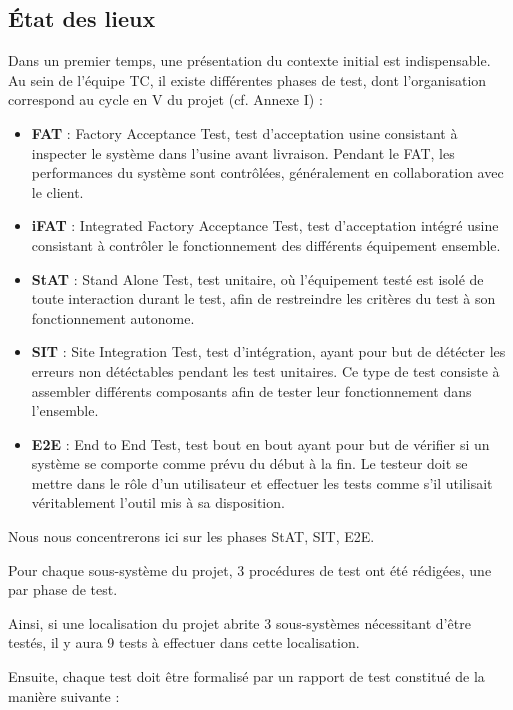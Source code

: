 \subsection{État des lieux}
Dans un premier temps, une présentation du contexte initial est indispensable. Au sein de l'équipe \gls{TC}, il existe différentes phases de test, dont l'organisation correspond au cycle en V du projet (cf. Annexe I) :
\begin{itemize}
\item \textbf{FAT} : Factory Acceptance Test, test d'acceptation usine consistant à inspecter le système dans l'usine avant livraison. Pendant le FAT, les performances du système sont contrôlées, généralement en collaboration avec le client.
\item \textbf{iFAT} : Integrated Factory Acceptance Test, test d'acceptation intégré usine consistant à contrôler le fonctionnement des différents équipement ensemble.
\item \textbf{\gls{StAT}} : Stand Alone Test, test unitaire, où  l'équipement testé est isolé de toute interaction durant le test, afin de restreindre les critères du test à son fonctionnement autonome.
\item \textbf{\gls{SIT}} : Site Integration Test, test d'intégration, ayant pour but de détécter les erreurs non détéctables pendant les test unitaires. Ce type de test consiste à assembler différents composants afin de tester leur fonctionnement dans l'ensemble.
\item \textbf{\gls{E2E}} : End to End Test, test bout en bout ayant pour but de vérifier si un système se comporte comme prévu du début à la fin. Le testeur doit se mettre dans le rôle d’un utilisateur et effectuer les tests comme s’il utilisait véritablement l’outil mis à sa disposition.
\end{itemize}

Nous nous concentrerons ici sur les phases \gls{StAT}, \gls{SIT}, \gls{E2E}. 

Pour chaque sous-système du projet, 3 procédures de test ont été rédigées, une par phase de test. 

Ainsi, si une localisation du projet abrite 3 sous-systèmes nécessitant d'être testés, il y aura 9 tests à effectuer dans cette localisation.

Ensuite, chaque test doit être formalisé par un rapport de test constitué de la manière suivante : 

